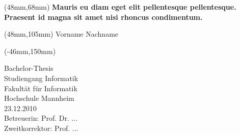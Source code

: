 %
% 
%
 
\begin{textblock*}{130mm}(48mm,68mm) %
	\centering\Large
	\textbf{Mauris eu diam eget elit pellentesque pellentesque. Praesent id magna sit amet nisi rhoncus condimentum.}
\end{textblock*}%

\begin{textblock*}{130mm}(48mm,105mm)
	\centering\large 
	Vorname Nachname
\end{textblock*}

\begin{textblock*}{297mm}(-46mm,150mm) %
	\begin{center}
		{Bachelor-Thesis\\Studiengang Informatik}\\
		\vspace{2cm}
		{Fakultät für Informatik\\Hochschule Mannheim}\\
		\vspace{2cm}
		{23.12.2010} \\ %
		\vspace{3,5cm}
		{Betreuerin: Prof. Dr. ...\\
		Zweitkorrektor: Prof. ...}
	\end{center}
\end{textblock*}

\null
\newpage